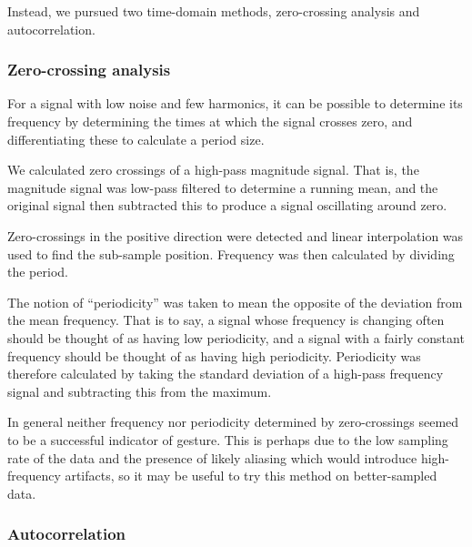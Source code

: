 \documentclass{article}
\begin{document}
Instead, we pursued two time-domain methods, zero-crossing analysis
and autocorrelation.

\subsubsection{Zero-crossing analysis}

For a signal with low noise and few harmonics, it can be possible to
determine its frequency by determining the times at which the signal
crosses zero, and differentiating these to calculate a period size.

We calculated zero crossings of a high-pass magnitude signal.  That
is, the magnitude signal was low-pass filtered to determine a running
mean, and the original signal then subtracted this to produce a signal
oscillating around zero.

Zero-crossings in the positive direction were detected and linear
interpolation was used to find the sub-sample position.
Frequency was then calculated by dividing the period.

The notion of ``periodicity'' was taken to mean the opposite of the
deviation from the mean frequency.
That is to say, a signal whose frequency is changing often should be
thought of as having low periodicity, and a signal with a fairly
constant frequency should be thought of as having high periodicity.
Periodicity was therefore calculated by taking the standard deviation
of a high-pass frequency signal and subtracting this from the maximum.

In general neither frequency nor periodicity determined by
zero-crossings seemed to be a successful indicator of gesture.
This is perhaps due to the low sampling rate of the data and the
presence of likely aliasing which would introduce high-frequency
artifacts, so it may be useful to try this method on better-sampled
data.

\subsubsection{Autocorrelation}
\end{document}
